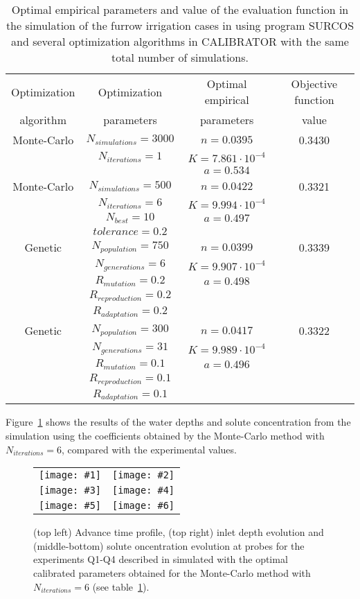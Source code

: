 \documentclass[review,authoryear]{elsarticle}
\newcommand{\TABLE}[5]
{
	\begin{table}[ht!]
		\centering
		\caption{#4.\label{#5}}
		#1
		\begin{tabular}{#2}
			#3
		\end{tabular}
	\end{table}
}
\newcommand{\FIGVI}[8]
{
	\begin{figure}[ht!]
		\centering
		\begin{tabular}{cc}
			\texttt{[image: \#1]} & \texttt{[image: \#2]} \\
			\texttt{[image: \#3]} & \texttt{[image: \#4]} \\
			\texttt{[image: \#5]} & \texttt{[image: \#6]}
		\end{tabular}
		\caption{#7.\label{#8}}
	\end{figure}
}
\begin{document}
\TABLE{\scriptsize}{cccc}
{
	Optimization & Optimization & Optimal empirical & Objective function
	\\ algorithm & parameters & parameters & value
	\\ \hline
	Monte-Carlo & $N_{simulations}=3000$ & $n=0.0395$ & 0.3430
	\\ & $N_{iterations}=1$ & $K=7.861\cdot 10^{-4}$
	\\ & & $a=0.534$
	\\ \hline
	Monte-Carlo & $N_{simulations}=500$ & $n=0.0422$ & 0.3321
	\\ & $N_{iterations}=6$ & $K=9.994\cdot 10^{-4}$
	\\ & $N_{best}=10$ & $a=0.497$
	\\ & $tolerance=0.2$
	\\ \hline
	Genetic & $N_{population}=750$ & $n=0.0399$ & 0.3339
	\\ & $N_{generations}=6$ & $K=9.907\cdot 10^{-4}$
	\\ & $R_{mutation}=0.2$ & $a=0.498$
	\\ & $R_{reproduction}=0.2$
	\\ & $R_{adaptation}=0.2$
	\\ \hline
	Genetic & $N_{population}=300$ & $n=0.0417$ & 0.3322
	\\ & $N_{generations}=31$ & $K=9.989\cdot 10^{-4}$
	\\ & $R_{mutation}=0.1$ & $a=0.496$
	\\ & $R_{reproduction}=0.1$
	\\ & $R_{adaptation}=0.1$
	\\ \hline
}{Optimal empirical parameters and value of the evaluation function in the simulation of the furrow irrigation cases in \citet{JaviSurcos2} using program SURCOS and several optimization algorithms in CALIBRATOR with the same total number of simulations}{TabSurcos}

Figure~\ref{FigSurcos} shows the results of the water depths and solute concentration from the simulation using the coefficients obtained by the Monte-Carlo method with $N_{iterations}=6$, compared with the experimental values.

\FIGVI{surcos-advance.eps}{surcos-depth.eps}{surcos-solute-q1.eps}
{surcos-solute-q2.eps}{surcos-solute-q3.eps}{surcos-solute-q4.eps}
{(top left) Advance time profile, (top right) inlet depth evolution and
(middle-bottom) solute oncentration evolution at probes for the experiments
Q1-Q4 described in \citet{JaviSurcos2} simulated with the optimal calibrated
parameters obtained for the Monte-Carlo method with $N_{iterations}=6$ (see
table~\ref{TabSurcos})}{FigSurcos}
\end{document}
